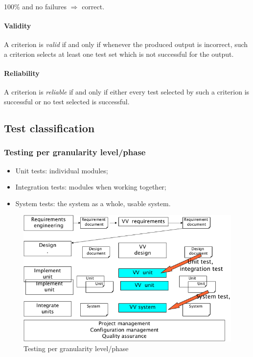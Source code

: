 100\% and no failures $\Rightarrow$ correct.

\paragraph{Validity} A criterion is \emph{valid} if and only if whenever the produced output is incorrect, such a criterion selects at least one test set which is not successful for the output.

\paragraph{Reliability} A criterion is \emph{reliable} if and only if either every test selected by such a criterion is successful or no test selected is successful.

\subsection{Test classification}
\subsubsection{Testing per granularity level/phase}
\begin{itemize}
\item Unit tests: individual modules;
\item Integration tests: modules when working together;
\item System tests: the system as a whole, usable system.
\end{itemize}

\begin{figure}[hbtp]
\centering
\includegraphics[scale=0.35]{images/testing_granularity_level.png}
\caption{Testing per granularity level/phase}
\end{figure}

